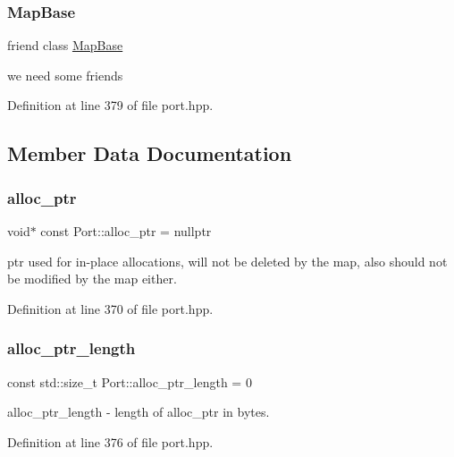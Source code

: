 \subsubsection{\texorpdfstring{Map\+Base}{MapBase}}
{\footnotesize\ttfamily friend class \hyperlink{class_map_base}{Map\+Base}\hspace{0.3cm}{\ttfamily [friend]}}

we need some friends 

Definition at line 379 of file port.\+hpp.



\subsection{Member Data Documentation}
\hypertarget{class_port_a78bf16e68f1dd5312f37b4e2806a9cf8}{}\label{class_port_a78bf16e68f1dd5312f37b4e2806a9cf8} 
\subsubsection{\texorpdfstring{alloc\+\_\+ptr}{alloc\_ptr}}
{\footnotesize\ttfamily void$\ast$ const Port\+::alloc\+\_\+ptr = nullptr\hspace{0.3cm}{\ttfamily [protected]}}

ptr used for in-\/place allocations, will not be deleted by the map, also should not be modified by the map either. 

Definition at line 370 of file port.\+hpp.

\hypertarget{class_port_a98d2e7e0e570e082465c692083300fa9}{}\label{class_port_a98d2e7e0e570e082465c692083300fa9} 
\subsubsection{\texorpdfstring{alloc\+\_\+ptr\+\_\+length}{alloc\_ptr\_length}}
{\footnotesize\ttfamily const std\+::size\+\_\+t Port\+::alloc\+\_\+ptr\+\_\+length = 0\hspace{0.3cm}{\ttfamily [protected]}}

alloc\+\_\+ptr\+\_\+length -\/ length of alloc\+\_\+ptr in bytes. 

Definition at line 376 of file port.\+hpp.

\hypertarget{class_port_ac17060db235459adaab87cdccb605884}{}\label{class_port_ac17060db235459adaab87cdccb605884} 
